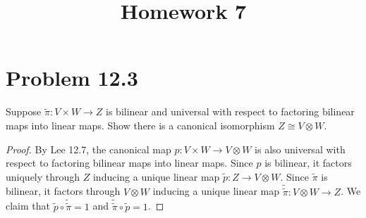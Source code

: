 \documentclass[11pt, letterpaper]{article}
\title{Homework 7}
\begin{document}
\makeproblem


\section{Problem 12.3}
\begin{problem}
	Suppose $\widetilde{\pi } : V\times W \to Z$ is bilinear and universal with respect to factoring bilinear maps into linear maps. Show there is a canonical isomorphism $Z\cong V\otimes W$.
\end{problem}
\begin{proof}
	By Lee 12.7, the canonical map $p : V\times W \to V\otimes W$ is also universal with respect to factoring bilinear maps into linear maps. Since $p$ is bilinear, it factors uniquely through $Z$ inducing a unique linear map $\widetilde{p} : Z \to V\otimes W$. Since $\widetilde{\pi } $ is bilinear, it factors through $V\otimes W$ inducing a unique linear map $\widetilde{\widetilde{\pi } } :V\otimes W\to Z$. We claim that $\widetilde{p} \circ \widetilde{\widetilde{\pi } } =1$ and $\widetilde{\widetilde{\pi } } \circ \widetilde{p} =1$.


\end{proof}
\end{document}
